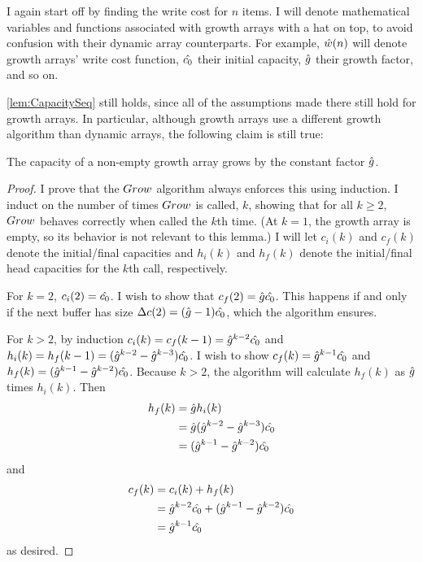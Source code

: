 \HdrGrowthArrayImpl

\HdrTimeComplex

I again start off by finding the write cost for $n$ items. I will denote mathematical variables and functions associated with growth arrays with a hat on top, to avoid confusion with their dynamic array counterparts. For example, $\hat{w}(n)$ will denote growth arrays' write cost function, $\hat{c_0}$ their initial capacity, $\hat{g}$ their growth factor, and so on.

\ref{lem:CapacitySeq} still holds, since all of the assumptions made there still hold for growth arrays. In particular, although growth arrays use a different growth algorithm than dynamic arrays, the following claim is still true:

\begin{lemma}
	The capacity of a non-empty growth array grows by the constant factor $\hat{g}$.
\end{lemma}

\begin{proof}
	I prove that the $Grow$ algorithm always enforces this using induction. I induct on the number of times $Grow$ is called, $k$, showing that for all $k \geq 2$, $Grow$ behaves correctly when called the $k$th time. (At $k = 1$, the growth array is empty, so its behavior is not relevant to this lemma.) I will let $c_i(k)$ and $c_f(k)$ denote the initial/final capacities and $h_i(k)$ and $h_f(k)$ denote the initial/final head capacities for the $k$th call, respectively.

	For $k = 2$, $c_i(2) = \hat{c_0}$. I wish to show that $c_f(2) = \hat{g}\hat{c_0}$. This happens if and only if the next buffer has size ${\Delta c}(2) = (\hat{g} - 1)\hat{c_0}$, which the algorithm ensures.
	
	For $k > 2$, by induction $c_i(k) = c_f(k - 1) = \hat{g}^{k - 2}\hat{c_0}$ and $h_i(k) = h_f(k - 1) = (\hat{g}^{k - 2} - \hat{g}^{k - 3})\hat{c_0}$. I wish to show $c_f(k) = \hat{g}^{k - 1}\hat{c_0}$ and $h_f(k) = (\hat{g}^{k - 1} - \hat{g}^{k - 2})\hat{c_0}$. Because $k > 2$, the algorithm will calculate $h_f(k)$ as $\hat{g}$ times $h_i(k)$. Then
	\begin{align*}
	h_f(k) &= \hat{g} h_i(k)\\
	&= \hat{g} (\hat{g}^{k - 2} - \hat{g}^{k - 3})\hat{c_0}\\
	&= (\hat{g}^{k - 1} - \hat{g}^{k - 2})\hat{c_0}
	\end{align*}
	and
	\begin{align*}
	c_f(k) &= c_i(k) + h_f(k)\\
	&= \hat{g}^{k - 2}\hat{c_0} + (\hat{g}^{k - 1} - \hat{g}^{k - 2})\hat{c_0}\\
	&= \hat{g}^{k - 1}\hat{c_0}
	\end{align*}
	as desired.
\end{proof}

